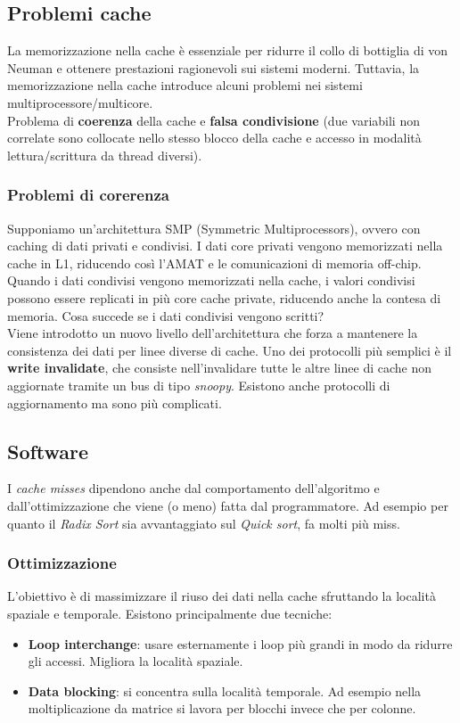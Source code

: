 \subsection{Problemi cache}
La memorizzazione nella cache è essenziale per ridurre il collo di bottiglia di von Neuman e ottenere prestazioni ragionevoli sui sistemi moderni. Tuttavia, la memorizzazione nella cache introduce alcuni problemi nei sistemi multiprocessore/multicore.\\ 
Problema di \textbf{coerenza} della cache e \textbf{falsa condivisione} (due variabili non correlate sono collocate nello stesso blocco della cache e accesso in modalità lettura/scrittura da thread diversi).

\subsubsection{Problemi di corerenza}
Supponiamo un'architettura SMP (Symmetric Multiprocessors), ovvero con caching di dati privati e condivisi. I dati core privati vengono memorizzati nella cache in L1, riducendo così l'AMAT e le comunicazioni di memoria off-chip. 
Quando i dati condivisi vengono memorizzati nella cache, i valori condivisi possono essere replicati in più core cache private, riducendo anche la contesa di memoria. Cosa succede se i dati condivisi vengono scritti? \\
Viene introdotto un nuovo livello dell'architettura che forza a mantenere la consistenza dei dati per linee diverse di cache. Uno dei protocolli più semplici è il \textbf{write invalidate}, che consiste nell'invalidare tutte le altre linee di cache non aggiornate tramite un bus di tipo \emph{snoopy}. Esistono anche protocolli di aggiornamento ma sono più complicati.

\subsection{Software}
I \textit{cache misses} dipendono anche dal comportamento dell'algoritmo e dall'ottimizzazione che viene (o meno) fatta dal programmatore. Ad esempio per quanto il \textit{Radix Sort} sia avvantaggiato sul \textit{Quick sort}, fa molti più miss.
\subsubsection{Ottimizzazione}
L'obiettivo è di massimizzare il riuso dei dati nella cache sfruttando la località spaziale e temporale. Esistono principalmente due tecniche:
\begin{itemize}
	\item \textbf{Loop interchange}: usare esternamente i loop più grandi in modo da ridurre gli accessi. Migliora la località spaziale.
	\item \textbf{Data blocking}: si concentra sulla località temporale. Ad esempio nella moltiplicazione da matrice si lavora per blocchi invece che per colonne.
\end{itemize}